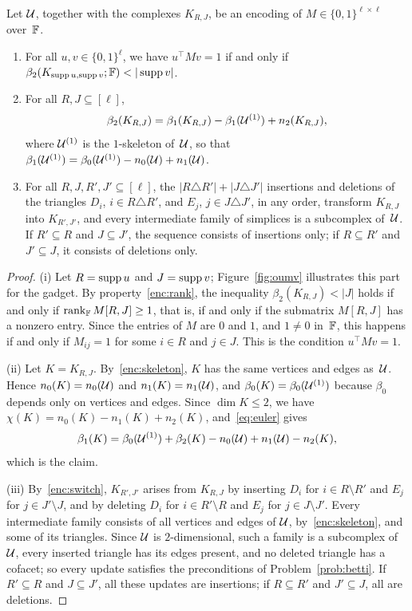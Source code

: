 \begin{lemma}\label{lem:round}
Let $\mathcal{U}$, together with the complexes $K_{R,J}$, be an encoding of $M\in\{0,1\}^{\ell\times\ell}$ over~$\mathbb{F}$.
\begin{enumerate}[label=(\roman*)]
\item For all $u,v\in\{0,1\}^{\ell}$, we have $u^{\top}Mv=1$ if and only if $\beta_2(K_{\supp u,\supp v};\F)<|\supp v|$.
\item For all $R,J\subseteq[\ell]$,
\[
  \beta_2(K_{R,J})=\beta_1(K_{R,J})-\beta_1(\mathcal{U}^{(1)})+n_2(K_{R,J}),
\]
where $\mathcal{U}^{(1)}$ is the $1$-skeleton of~$\mathcal{U}$, so that $\beta_1(\mathcal{U}^{(1)})=\beta_0(\mathcal{U}^{(1)})-n_0(\mathcal{U})+n_1(\mathcal{U})$.
\item For all $R,J,R',J'\subseteq[\ell]$, the $|R\triangle R'|+|J\triangle J'|$ insertions and deletions of the triangles $D_i$, $i\in R\triangle R'$, and $E_j$, $j\in J\triangle J'$, in any order, transform $K_{R,J}$ into $K_{R',J'}$, and every intermediate family of simplices is a subcomplex of~$\mathcal{U}$.
If $R'\subseteq R$ and $J\subseteq J'$, the sequence consists of insertions only; if $R\subseteq R'$ and $J'\subseteq J$, it consists of deletions only.
\end{enumerate}
\end{lemma}

\begin{proof}
(i) Let $R=\operatorname{supp} u$ and $J=\operatorname{supp} v$; Figure~\ref{fig:oumv} illustrates this part for the gadget.
By property~\ref{enc:rank}, the inequality $\beta_2(K_{R,J})<|J|$ holds if and only if $\operatorname{rank}_{\mathbb{F}}M[R,J]\ge1$, that is, if and only if the submatrix $M[R,J]$ has a nonzero entry.
Since the entries of $M$ are $0$ and $1$, and $1\ne0$ in~$\mathbb{F}$, this happens if and only if $M_{ij}=1$ for some $i\in R$ and $j\in J$.
This is the condition $u^{\top}Mv=1$.

(ii) Let $K=K_{R,J}$.
By~\ref{enc:skeleton}, $K$ has the same vertices and edges as~$\mathcal{U}$.
Hence $n_0(K)=n_0(\mathcal{U})$ and $n_1(K)=n_1(\mathcal{U})$, and $\beta_0(K)=\beta_0(\mathcal{U}^{(1)})$ because $\beta_0$ depends only on vertices and edges.
Since $\dim K\le2$, we have $\chi(K)=n_0(K)-n_1(K)+n_2(K)$, and~\eqref{eq:euler} gives
\[
  \beta_1(K)=\beta_0(\mathcal{U}^{(1)})+\beta_2(K)-n_0(\mathcal{U})+n_1(\mathcal{U})-n_2(K),
\]
which is the claim.

(iii) By~\ref{enc:switch}, $K_{R',J'}$ arises from $K_{R,J}$ by inserting $D_i$ for $i\in R\setminus R'$ and $E_j$ for $j\in J'\setminus J$, and by deleting $D_i$ for $i\in R'\setminus R$ and $E_j$ for $j\in J\setminus J'$.
Every intermediate family consists of all vertices and edges of $\mathcal{U}$, by~\ref{enc:skeleton}, and some of its triangles.
Since $\mathcal{U}$ is $2$-dimensional, such a family is a subcomplex of~$\mathcal{U}$, every inserted triangle has its edges present, and no deleted triangle has a cofacet; so every update satisfies the preconditions of Problem~\ref{prob:betti}.
If $R'\subseteq R$ and $J\subseteq J'$, all these updates are insertions; if $R\subseteq R'$ and $J'\subseteq J$, all are deletions.
\end{proof}

